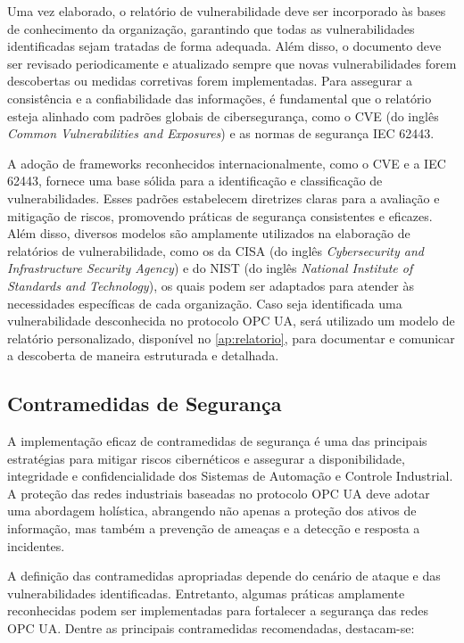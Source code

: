         Uma vez elaborado, o relatório de vulnerabilidade deve ser incorporado às bases de conhecimento da organização, garantindo que todas as vulnerabilidades identificadas sejam tratadas de forma adequada. Além disso, o documento deve ser revisado periodicamente e atualizado sempre que novas vulnerabilidades forem descobertas ou medidas corretivas forem implementadas. Para assegurar a consistência e a confiabilidade das informações, é fundamental que o relatório esteja alinhado com padrões globais de cibersegurança, como o CVE (do inglês \textit{Common Vulnerabilities and Exposures}) e as normas de segurança IEC 62443.

        A adoção de frameworks reconhecidos internacionalmente, como o CVE e a IEC 62443, fornece uma base sólida para a identificação e classificação de vulnerabilidades. Esses padrões estabelecem diretrizes claras para a avaliação e mitigação de riscos, promovendo práticas de segurança consistentes e eficazes. Além disso, diversos modelos são amplamente utilizados na elaboração de relatórios de vulnerabilidade, como os da CISA (do inglês \textit{Cybersecurity and Infrastructure Security Agency}) e do NIST (do inglês \textit{National Institute of Standards and Technology}), os quais podem ser adaptados para atender às necessidades específicas de cada organização. Caso seja identificada uma vulnerabilidade desconhecida no protocolo OPC UA, será utilizado um modelo de relatório personalizado, disponível no \autoref{ap:relatorio}, para documentar e comunicar a descoberta de maneira estruturada e detalhada.

    \subsection{Contramedidas de Segurança}

        A implementação eficaz de contramedidas de segurança é uma das principais estratégias para mitigar riscos cibernéticos e assegurar a disponibilidade, integridade e confidencialidade dos Sistemas de Automação e Controle Industrial. A proteção das redes industriais baseadas no protocolo OPC UA deve adotar uma abordagem holística, abrangendo não apenas a proteção dos ativos de informação, mas também a prevenção de ameaças e a detecção e resposta a incidentes.
        
        A definição das contramedidas apropriadas depende do cenário de ataque e das vulnerabilidades identificadas. Entretanto, algumas práticas amplamente reconhecidas podem ser implementadas para fortalecer a segurança das redes OPC UA. Dentre as principais contramedidas recomendadas, destacam-se:
        
